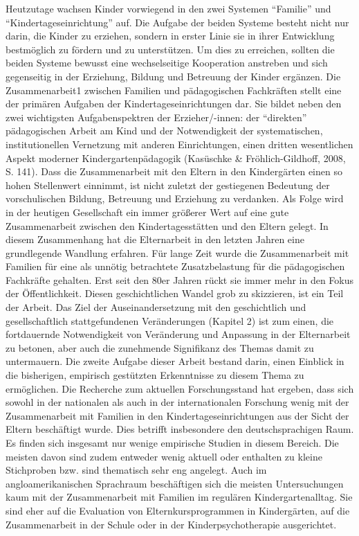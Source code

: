 \documentclass[12pt,a4paper]{article}
\begin{document}
Heutzutage wachsen Kinder vorwiegend in den zwei Systemen "`Familie"' und "`Kindertageseinrichtung"' auf. Die Aufgabe der beiden Systeme besteht nicht nur darin, die Kinder zu erziehen, sondern in erster Linie sie in ihrer Entwicklung bestmöglich zu fördern und zu unterstützen. Um dies zu erreichen, sollten die beiden Systeme bewusst eine wechselseitige Kooperation anstreben und sich gegenseitig in der Erziehung, Bildung und Betreuung der Kinder ergänzen.	  
Die Zusammenarbeit1 zwischen Familien und pädagogischen Fachkräften stellt eine der primären Aufgaben der Kindertageseinrichtungen dar. Sie bildet neben den zwei wichtigsten Aufgabenspektren der Erzieher/-innen: der "`direkten"' pädagogischen Arbeit am Kind und der Notwendigkeit der systematischen, institutionellen Vernetzung mit anderen Einrichtungen, einen dritten wesentlichen Aspekt moderner Kindergartenpädagogik (Kasüschke \& Fröhlich-Gildhoff, 2008, S. 141). Dass die Zusammenarbeit mit den Eltern in den Kindergärten einen so hohen Stellenwert einnimmt, ist nicht zuletzt der gestiegenen Bedeutung der vorschulischen Bildung, Betreuung und Erziehung zu verdanken. Als Folge wird in der heutigen Gesellschaft ein immer größerer Wert auf eine gute Zusammenarbeit zwischen den Kindertagesstätten und den Eltern gelegt. In diesem Zusammenhang hat die Elternarbeit in den letzten Jahren eine grundlegende Wandlung erfahren. Für lange Zeit wurde die Zusammenarbeit mit Familien für eine als unnötig betrachtete Zusatzbelastung für die pädagogischen Fachkräfte gehalten. Erst seit den 80er Jahren rückt sie immer mehr in den Fokus der Öffentlichkeit. Diesen geschichtlichen Wandel grob zu skizzieren, ist ein Teil der Arbeit. Das Ziel der Auseinandersetzung mit den geschichtlich und gesellschaftlich stattgefundenen Veränderungen (Kapitel 2) ist zum einen, die fortdauernde Notwendigkeit von Veränderung und Anpassung in der Elternarbeit zu betonen, aber auch die zunehmende Signifikanz des Themas damit zu untermauern.
	Die zweite Aufgabe dieser Arbeit bestand darin, einen Einblick in die bisherigen, empirisch gestützten Erkenntnisse zu diesem Thema zu ermöglichen. Die Recherche zum aktuellen Forschungsstand hat ergeben, dass sich sowohl in der nationalen als auch in der internationalen Forschung wenig mit der Zusammenarbeit mit Familien in den Kindertageseinrichtungen aus der Sicht der Eltern beschäftigt wurde. Dies betrifft insbesondere den deutschsprachigen Raum.  Es finden sich insgesamt nur wenige empirische Studien in diesem Bereich. Die meisten davon sind zudem entweder wenig aktuell oder enthalten zu kleine Stichproben bzw. sind thematisch sehr eng angelegt. Auch im angloamerikanischen Sprachraum beschäftigen sich die meisten Untersuchungen kaum mit der Zusammenarbeit mit Familien im regulären Kindergartenalltag. Sie sind eher auf die Evaluation von Elternkursprogrammen in Kindergärten, auf die Zusammenarbeit in der Schule oder in der Kinderpsychotherapie ausgerichtet.  
\end{document}
